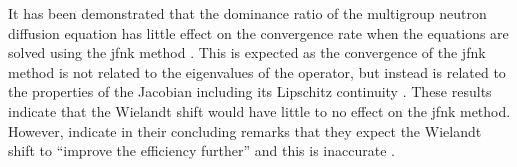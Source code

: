       It has been demonstrated that the dominance ratio of the multigroup
      neutron diffusion equation has little effect on the convergence rate when
      the equations are solved using the \gls{jfnk} method \cite{gill_azmy}.
      This is expected as the convergence of the \gls{jfnk} method is not
      related to the eigenvalues of the operator, but instead is related to the
      properties of the Jacobian including its Lipschitz continuity
      \cite{textbookkelley}. These results indicate that the Wielandt shift
      would have little to no effect on the \gls{jfnk} method. However,
      \citeauthor{qe2paper} indicate in their concluding remarks that they
      expect the Wielandt shift to ``improve the efficiency further'' and this
      is inaccurate \cite{qe2paper}.
      
